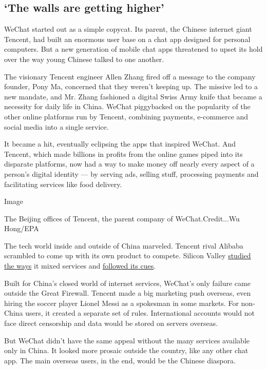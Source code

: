 \hypertarget{the-walls-are-getting-higher}{%
\subsection{`The walls are getting
higher'}\label{the-walls-are-getting-higher}}

WeChat started out as a simple copycat. Its parent, the Chinese internet
giant Tencent, had built an enormous user base on a chat app designed
for personal computers. But a new generation of mobile chat apps
threatened to upset its hold over the way young Chinese talked to one
another.

The visionary Tencent engineer Allen Zhang fired off a message to the
company founder, Pony Ma, concerned that they weren't keeping up. The
missive led to a new mandate, and Mr. Zhang fashioned a digital Swiss
Army knife that became a necessity for daily life in China. WeChat
piggybacked on the popularity of the other online platforms run by
Tencent, combining payments, e-commerce and social media into a single
service.

It became a hit, eventually eclipsing the apps that inspired WeChat. And
Tencent, which made billions in profits from the online games piped into
its disparate platforms, now had a way to make money off nearly every
aspect of a person's digital identity --- by serving ads, selling stuff,
processing payments and facilitating services like food delivery.

Image

The Beijing offices of Tencent, the parent company of WeChat.Credit...Wu
Hong/EPA

The tech world inside and outside of China marveled. Tencent rival
Alibaba scrambled to come up with its own product to compete. Silicon
Valley
\href{https://www.nytimes3xbfgragh.onion/2016/08/03/technology/china-mobile-tech-innovation-silicon-valley.html}{studied
the ways} it mixed services and
\href{https://www.nytimes3xbfgragh.onion/2019/03/07/technology/facebook-zuckerberg-wechat.html}{followed
its cues}.

Built for China's closed world of internet services, WeChat's only
failure came outside the Great Firewall. Tencent made a big marketing
push overseas, even hiring the soccer player Lionel Messi as a spokesman
in some markets. For non-China users, it created a separate set of
rules. International accounts would not face direct censorship and data
would be stored on servers overseas.

But WeChat didn't have the same appeal without the many services
available only in China. It looked more prosaic outside the country,
like any other chat app. The main overseas users, in the end, would be
the Chinese diaspora.

